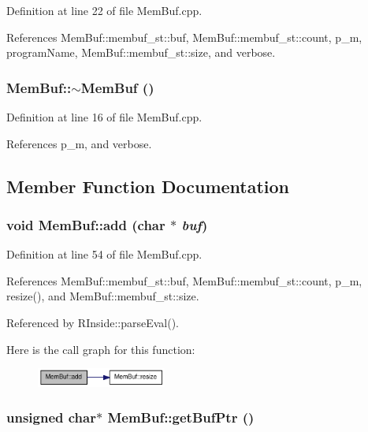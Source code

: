 Definition at line 22 of file MemBuf.cpp.

References MemBuf::membuf\_\-st::buf, MemBuf::membuf\_\-st::count, p\_\-m, programName, MemBuf::membuf\_\-st::size, and verbose.\hypertarget{classMemBuf_a84884d61f69e047814a365e8f0053829}{
\subsubsection[{$\sim$MemBuf}]{\setlength{\rightskip}{0pt plus 5cm}MemBuf::$\sim$MemBuf ()}}
\label{classMemBuf_a84884d61f69e047814a365e8f0053829}


Definition at line 16 of file MemBuf.cpp.

References p\_\-m, and verbose.

\subsection{Member Function Documentation}
\hypertarget{classMemBuf_a98a5b5de27fb73dd3433773b825faf21}{
\subsubsection[{add}]{\setlength{\rightskip}{0pt plus 5cm}void MemBuf::add (char $\ast$ {\em buf})}}
\label{classMemBuf_a98a5b5de27fb73dd3433773b825faf21}


Definition at line 54 of file MemBuf.cpp.

References MemBuf::membuf\_\-st::buf, MemBuf::membuf\_\-st::count, p\_\-m, resize(), and MemBuf::membuf\_\-st::size.

Referenced by RInside::parseEval().

Here is the call graph for this function:\nopagebreak
\begin{figure}[H]
\begin{center}
\leavevmode
\includegraphics[width=121pt]{classMemBuf_a98a5b5de27fb73dd3433773b825faf21_cgraph}
\end{center}
\end{figure}
\hypertarget{classMemBuf_a910edfa13107da037c7ccfc80adc0243}{
\subsubsection[{getBufPtr}]{\setlength{\rightskip}{0pt plus 5cm}unsigned char$\ast$ MemBuf::getBufPtr ()}}
\label{classMemBuf_a910edfa13107da037c7ccfc80adc0243}


